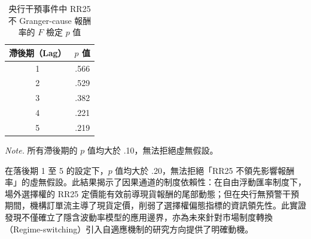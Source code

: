 \begin{table}[htbp]
    \centering
    \linespread{1.2}\selectfont
    \renewcommand{\arraystretch}{1.2}
    \fontsize{11pt}{15pt}\selectfont
    \vspace{3mm}
    \caption{央行干預事件中 RR25 不 Granger-cause 報酬率的 $F$ 檢定 $p$ 值}
    \label{tab:twd_granger}
    \begin{tabular}{cc}
        \hline
        \textbf{滯後期（Lag）} & $p$ \textbf{值} \\
        \hline
        1 & .566 \\
        2 & .529 \\
        3 & .382 \\
        4 & .221 \\
        5 & .219 \\
        \hline
    \end{tabular}
    
    \vspace{3mm}
    
    \begin{minipage}{0.28\textwidth}
        \fontsize{9pt}{13pt}\selectfont
        \textit{Note.} 所有滯後期的 $p$ 值均大於 .10，無法拒絕虛無假設。
    \end{minipage}
\end{table}

在落後期 1 至 5 的設定下，$p$ 值均大於 .20，無法拒絕「RR25 不領先影響報酬率」的虛無假設。此結果揭示了因果通道的制度依賴性：在自由浮動匯率制度下，場外選擇權的 RR25 定價能有效前導現貨報酬的尾部動態；但在央行無預警干預期間，機構訂單流主導了現貨定價，削弱了選擇權偏態指標的資訊領先性。此實證發現不僅確立了隱含波動率模型的應用邊界，亦為未來針對市場制度轉換（Regime-switching）引入自適應機制的研究方向提供了明確動機。